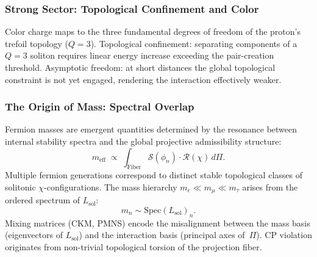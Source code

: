 \subsubsection*{Strong Sector: Topological Confinement and Color}
\label{subsec:qcd-topology}

Color charge maps to the three fundamental degrees of freedom of the
proton's trefoil topology ($Q=3$).
Topological confinement: separating components of a $Q=3$ soliton
requires linear energy increase exceeding the pair-creation threshold.
Asymptotic freedom: at short distances the global topological constraint
is not yet engaged, rendering the interaction effectively weaker.

\subsubsection*{The Origin of Mass: Spectral Overlap}
\label{subsec:yukawa-overlap}

Fermion masses are emergent quantities determined by the resonance
between internal stability spectra and the global projective admissibility structure:
\begin{equation}
  m_{\mathrm{eff}} \;\propto\;
    \int_{\mathrm{Fiber}}
    \mathcal{S}(\phi_n) \cdot \mathcal{R}(\chi)
    \, d\Pi .
\end{equation}
Multiple fermion generations correspond to distinct stable topological
classes of solitonic $\chi$-configurations.
The mass hierarchy $m_e \ll m_\mu \ll m_\tau$ arises from the ordered
spectrum of $L_{\mathrm{sol}}$:
\begin{equation}
  m_n \sim \mathrm{Spec}(L_{\mathrm{sol}})_n .
\end{equation}
Mixing matrices (CKM, PMNS) encode the misalignment between the mass
basis (eigenvectors of $L_{\mathrm{sol}}$) and the interaction basis
(principal axes of~$\Pi$).
CP violation originates from non-trivial topological torsion of the
projection fiber.
